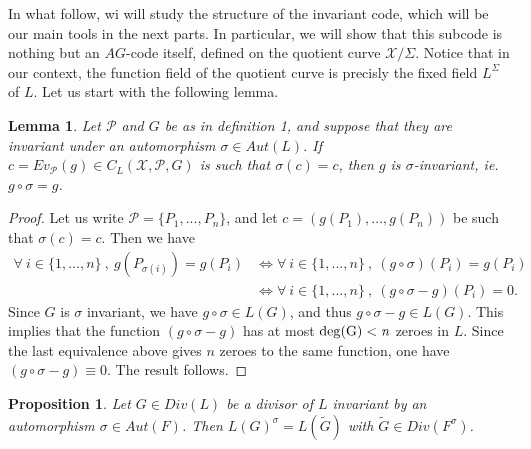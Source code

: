 \documentclass[10pt]{article}
\newtheorem{prop1}{Proposition}[]
\newtheorem{lem1}{Lemma}[]
\newcommand{\s}{\vspace{0.3cm}}
\newcommand{\X}{\mathcal{X}}
\newcommand{\PR}{\mathcal{P}}
\begin{document}
In what follow, wi will study the structure of the invariant code, which will be our main tools in the next parts. In particular, we will show that this subcode is nothing but an $AG$-code itself, defined on the quotient curve $\X/\Sigma$. Notice that in our context, the function field of the quotient curve is precisly the fixed field $L^{\Sigma}$ of $L$. Let us start with the following lemma.

\s

\begin{lem1}
Let $\PR$ and $G$ be as in definition 1, and suppose that they are invariant under an automorphism $\sigma \in Aut(L)$. If $c = Ev_{\PR}(g) \in C_L(\X,\PR,G)$ is such that $\sigma(c) = c$, then $g$ is $\sigma$-invariant, ie. $g\circ \sigma = g$. 
\end{lem1}

\s

\begin{proof}
Let us write $\PR = \{P_1,...,P_n\}$, and let $c=(g(P_1),...,g(P_n))$ be such that $\sigma(c)=c$. Then we have 
\begin{align*}
\forall \ i \in \{1,...,n\} \ , \ g(P_{\sigma(i)}) = g(P_i) &\iff \forall \ i \in \{1,...,n\} \ , \ (g \circ \sigma)(P_i) =g(P_i) \\
& \iff \forall \ i \in \{1,...,n\} \ , \ (g\circ \sigma - g)(P_i) = 0.
\end{align*}
Since $G$ is $\sigma$ invariant, we have $g \circ \sigma \in L(G)$, and thus $g\circ \sigma - g \in L(G)$. This implies that the function $(g \circ \sigma - g)$ has at most $\rm{deg}(G)<\it{n}$ zeroes in $L$. Since the last equivalence above gives $n$ zeroes to the same function, one have $(g \circ \sigma - g) \equiv 0$. The result follows.
\end{proof}

\s

\begin{prop1}
Let $G \in Div(L)$ be a divisor of $L$ invariant by an automorphism $\sigma \in Aut(F)$. Then $L(G)^{\sigma} = L(\tilde{G})$ with $\tilde{G} \in Div(F^{\sigma})$.
\end{prop1}

\s
\end{document}
